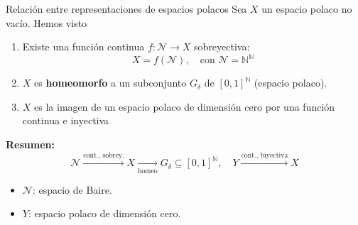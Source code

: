 \documentclass[8pt]{beamer}
\begin{document}
\begin{frame}{Relación entre representaciones de espacios polacos}
    Sea $X$ un espacio polaco no vacío. Hemos visto
    \begin{enumerate}
        \item Existe una función continua $f: \mathcal{N}\longrightarrow X$ sobreyectiva:
        \[
        X = f(\mathcal{N}), \quad \text{con } \mathcal{N} = \mathbb{N}^\mathbb{N}
        \]
        \item $X$ es \textbf{homeomorfo} a un subconjunto $G_\delta$ de $[0,1]^\mathbb{N}$ (espacio polaco).
        \item $X$ es la imagen de un espacio polaco de dimensión cero por una función continua e inyectiva
    \end{enumerate}
    \vspace{0.5cm}   
    
   \textbf{Resumen:}
\[
\mathcal{N} \xrightarrow{\text{cont., sobrey.}} X 
\xrightarrow[\text{homeo}]{\phantom{\text{homeo}}} 
G_\delta \subseteq [0,1]^\mathbb{N},
\quad 
Y \xrightarrow{\text{cont., biyectiva}} X
\]
\begin{itemize}
  \item \( \mathcal{N} \): espacio de Baire.
  \item \( Y \): espacio polaco de dimensión cero.
\end{itemize}

\end{frame}

\end{document}
